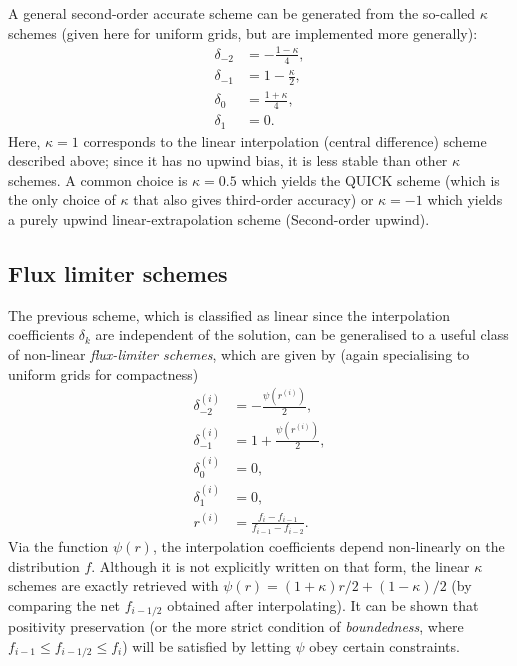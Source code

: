 \documentclass{notes}
\begin{document}
    A general second-order accurate scheme can be generated from the so-called
    $\kappa$ schemes (given here for uniform grids, but are implemented more generally):
    \begin{align*}
    \delta_{-2} &= -\frac{1-\kappa}{4}, \nonumber \\
    \delta_{-1} &= 1 - \frac{\kappa}{2}, \nonumber \\
    \delta_0 &= \frac{1+\kappa}{4}, \nonumber \\
    \delta_1 &= 0.
    \end{align*}
    Here, $\kappa = 1$ corresponds to the linear interpolation (central difference) 
    scheme described above; since it has no upwind bias, it is less stable than other 
    $\kappa$ schemes. A common choice is $\kappa=0.5$ which yields the QUICK 
    scheme (which is the only choice of $\kappa$ that also gives third-order accuracy) 
    or $\kappa=-1$ which yields a purely upwind linear-extrapolation scheme (Second-order upwind).

    \subsection{Flux limiter schemes}
    The previous scheme, which is classified as linear since the interpolation 
    coefficients $\delta_k$ are independent of the solution, can be generalised to a 
    useful class of non-linear \emph{flux-limiter schemes}, which are given by
    (again specialising to uniform grids for compactness)
    \begin{align}
    \delta^{(i)}_{-2} &= -\frac{\psi(r^{(i)})}{2}, \nonumber \\
    \delta^{(i)}_{-1} &= 1 + \frac{\psi(r^{(i)})}{2}, \nonumber \\
    \delta^{(i)}_{0} &= 0, \nonumber \\
    \delta^{(i)}_{1} &= 0, \nonumber \\
    r^{(i)} &= \frac{f_i - f_{i-1}}{f_{i-1}-f_{i-2}}.
    \end{align}
    Via the function $\psi(r)$, the interpolation coefficients depend non-linearly on 
    the distribution $f$. Although it is not explicitly written on that form, the linear $\kappa$ schemes 
    are exactly retrieved with $\psi(r) = (1+\kappa)r/2 + (1-\kappa)/2$ (by comparing the net $f_{i-1/2}$ 
    obtained after interpolating). It can be shown that positivity preservation (or the more strict condition 
    of \emph{boundedness}, where $f_{i-1} \leq f_{i-1/2} \leq f_i$)
    will be satisfied by letting $\psi$ obey certain constraints.
    
\end{document}
